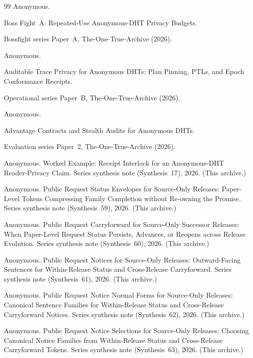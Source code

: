 \documentclass[11pt]{article}
\begin{document}
\begin{thebibliography}{99}
Anonymous.

\newblock Boss Fight~A: Repeated-Use Anonymous-DHT Privacy Budgets.

\newblock Bossfight series Paper~A, The-One-True-Archive (2026).

Anonymous.

\newblock Auditable Trace Privacy for Anonymous DHTs: Plan Pinning, PTLs, and Epoch Conformance Receipts.

\newblock Operational series Paper~B, The-One-True-Archive (2026).

Anonymous.

\newblock Advantage Contracts and Stealth Audits for Anonymous DHTs.

\newblock Evaluation series Paper~2, The-One-True-Archive (2026).

Anonymous.
\newblock Worked Example: Receipt Interlock for an Anonymous-DHT Reader-Privacy Claim.
\newblock Series synthesis note (Synthesis~17), 2026. (This archive.)


Anonymous.
\newblock Public Request Status Envelopes for Source-Only Releases: Paper-Level Tokens Compressing Family Completion without Re-owning the Promise.
\newblock Series synthesis note (Synthesis~59), 2026. (This archive.)


Anonymous.
\newblock Public Request Carryforward for Source-Only Successor Releases: When Paper-Level Request Status Persists, Advances, or Reopens across Release Evolution.
\newblock Series synthesis note (Synthesis~60), 2026. (This archive.)

Anonymous.
\newblock Public Request Notices for Source-Only Releases: Outward-Facing Sentences for Within-Release Status and Cross-Release Carryforward.
\newblock Series synthesis note (Synthesis~61), 2026. (This archive.)

Anonymous.
\newblock Public Request Notice Normal Forms for Source-Only Releases: Canonical Sentence Families for Within-Release Status and Cross-Release Carryforward Notices.
\newblock Series synthesis note (Synthesis~62), 2026. (This archive.)

Anonymous.
\newblock Public Request Notice Selections for Source-Only Releases: Choosing Canonical Notice Families from Within-Release Status and Cross-Release Carryforward Tokens.
\newblock Series synthesis note (Synthesis~63), 2026. (This archive.)


\end{thebibliography}
\end{document}
